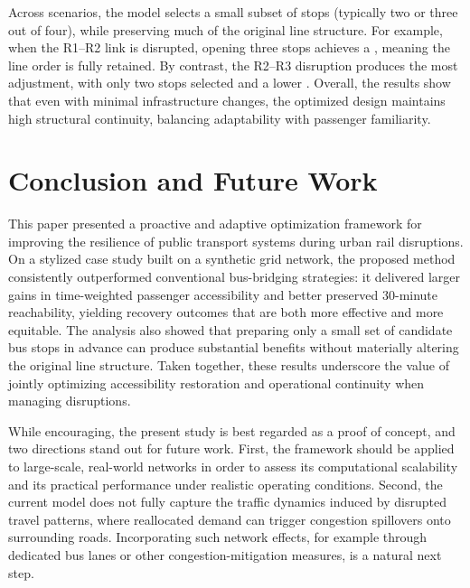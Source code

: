 \documentclass[3p,times,procedia]{elsarticle}
\begin{document}
Across scenarios, the model selects a small subset of stops (typically two or three out of four), while preserving much of the original line structure. For example, when the R1--R2 link is disrupted, opening three stops achieves a , meaning the line order is fully retained. By contrast, the R2--R3 disruption produces the most adjustment, with only two stops selected and a lower . Overall, the results show that even with minimal infrastructure changes, the optimized design maintains high structural continuity, balancing adaptability with passenger familiarity.


\section{Conclusion and Future Work}\label{sec:conclusion}
This paper presented a proactive and adaptive optimization framework for improving the resilience of public transport systems during urban rail disruptions. On a stylized case study built on a synthetic grid network, the proposed method consistently outperformed conventional bus-bridging strategies: it delivered larger gains in time-weighted passenger accessibility and better preserved 30-minute reachability, yielding recovery outcomes that are both more effective and more equitable. The analysis also showed that preparing only a small set of candidate bus stops in advance can produce substantial benefits without materially altering the original line structure. Taken together, these results underscore the value of jointly optimizing accessibility restoration and operational continuity when managing disruptions.

While encouraging, the present study is best regarded as a proof of concept, and two directions stand out for future work. First, the framework should be applied to large-scale, real-world networks in order to assess its computational scalability and its practical performance under realistic operating conditions. Second, the current model does not fully capture the traffic dynamics induced by disrupted travel patterns, where reallocated demand can trigger congestion spillovers onto surrounding roads. Incorporating such network effects, for example through dedicated bus lanes or other congestion-mitigation measures, is a natural next step.
\end{document}
